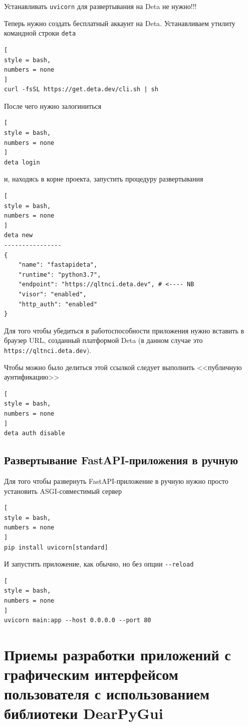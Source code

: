 \documentclass[%
	11pt,
	a4paper,
	utf8,
		]{article}
\begin{document}
Устанавливать \texttt{uvicorn} для развертывания на Deta не нужно!!!

Теперь нужно создать бесплатный аккаунт на Deta. Устанавливаем утилиту командной строки \texttt{deta}
\begin{lstlisting}[
style = bash,
numbers = none	
]
curl -fsSL https://get.deta.dev/cli.sh | sh
\end{lstlisting}

После чего нужно залогиниться
\begin{lstlisting}[
style = bash,
numbers = none	
]
deta login
\end{lstlisting}
и, находясь в корне проекта, запустить процедуру развертывания
\begin{lstlisting}[
style = bash,
numbers = none
]
deta new
----------------
{
	"name": "fastapideta",
	"runtime": "python3.7",
	"endpoint": "https://qltnci.deta.dev", # <---- NB
	"visor": "enabled",
	"http_auth": "enabled"
}
\end{lstlisting}

Для того чтобы убедиться в работоспособности приложения нужно вставить в браузер URL, созданный платформой Deta (в данном случае это \texttt{https://qltnci.deta.dev}).

Чтобы можно было делиться этой ссылкой следует выполнить <<публичную аунтификацию>>
\begin{lstlisting}[
style = bash,
numbers = none	
]
deta auth disable
\end{lstlisting}


\subsection{Развертывание FastAPI-приложения в ручную}

Для того чтобы развернуть FastAPI-приложение в ручную нужно просто установить ASGI-совместимый сервер
\begin{lstlisting}[
style = bash,
numbers = none	
]
pip install uvicorn[standard]
\end{lstlisting}

И запустить приложение, как обычно, но без опции \verb|--reload|
\begin{lstlisting}[
style = bash,
numbers = none
]
uvicorn main:app --host 0.0.0.0 --port 80
\end{lstlisting}


\section{Приемы разработки приложений с графическим интерфейсом пользователя с использованием библиотеки DearPyGui}
\end{document}
